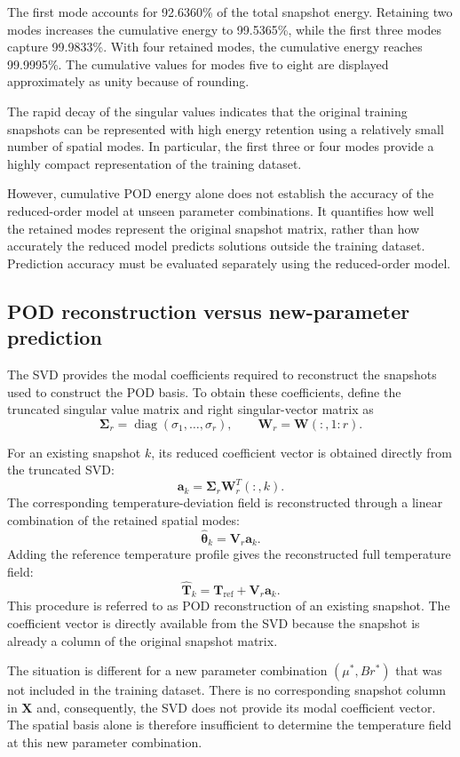 The first mode accounts for 92.6360\% of the total snapshot
energy. Retaining two modes increases the cumulative energy
to 99.5365\%, while the first three modes capture 99.9833\%.
With four retained modes, the cumulative energy reaches
99.9995\%. The cumulative values for modes five to eight
are displayed approximately as unity because of rounding.

The rapid decay of the singular values indicates that the
original training snapshots can be represented with high
energy retention using a relatively small number of spatial
modes. In particular, the first three or four modes provide
a highly compact representation of the training dataset.

However, cumulative POD energy alone does not establish
the accuracy of the reduced-order model at unseen parameter
combinations. It quantifies how well the retained modes
represent the original snapshot matrix, rather than how
accurately the reduced model predicts solutions outside the
training dataset. Prediction accuracy must be evaluated
separately using the reduced-order model.

\subsection{POD reconstruction versus new-parameter prediction}

The SVD provides the modal coefficients required to
reconstruct the snapshots used to construct the POD basis.
To obtain these coefficients, define the truncated singular
value matrix and right singular-vector matrix as
\[
\mathbf{\Sigma}_r
=
\operatorname{diag}(\sigma_1,\ldots,\sigma_r),
\qquad
\mathbf{W}_r=\mathbf{W}(:,1:r).
\]

For an existing snapshot $k$, its reduced coefficient vector
is obtained directly from the truncated SVD:
\[
\boxed{
\mathbf{a}_k
=
\mathbf{\Sigma}_r\mathbf{W}_r^T(:,k).
}
\]
The corresponding temperature-deviation field is
reconstructed through a linear combination of the retained
spatial modes:
\[
\hat{\boldsymbol{\theta}}_k
=
\mathbf{V}_r\mathbf{a}_k.
\]
Adding the reference temperature profile gives the
reconstructed full temperature field:
\[
\boxed{
\hat{\mathbf{T}}_k
=
\mathbf{T}_{\mathrm{ref}}
+
\mathbf{V}_r\mathbf{a}_k.
}
\]
This procedure is referred to as POD reconstruction of an
existing snapshot. The coefficient vector is directly
available from the SVD because the snapshot is already a
column of the original snapshot matrix.

The situation is different for a new parameter combination
$(\mu^*,Br^*)$ that was not included in the training dataset.
There is no corresponding snapshot column in $\mathbf{X}$
and, consequently, the SVD does not provide its modal
coefficient vector. The spatial basis alone is therefore
insufficient to determine the temperature field at this new
parameter combination.

